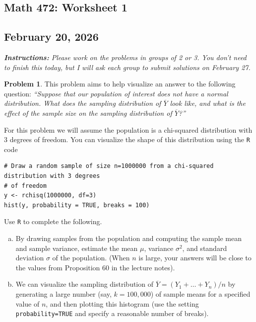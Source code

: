 \documentclass[10pt]{article}
\theoremstyle{definition}
\newtheorem{problem}[theorem]{Problem}
\begin{document}
\begin{center}
  \section*{Math 472: Worksheet 1}
  \subsection*{February 20, 2026}
\end{center}

\textit{\textbf{Instructions:} Please work on the problems in groups of 2 or
  3. You don't need to finish this today, but I will ask each group to submit
  solutions on February 27.}

\vspace{1em}

\begin{problem}
  \label{problem:chi-squared}
  This problem aims to help visualize an answer to the following question:
  \textit{``Suppose that our population of interest does not have a normal
    distribution. What does the sampling distribution of $\overline{Y}$ look
    like, and what is the effect of the sample size on the sampling
    distribution of $\overline{Y}$?''}

  For this problem we will assume the population is a chi-squared distribution
  with 3 degrees of freedom. You can visualize the shape of this distribution
  using the \texttt{R} code
\begin{verbatim}
# Draw a random sample of size n=1000000 from a chi-squared distribution with 3 degrees
# of freedom
y <- rchisq(1000000, df=3)
hist(y, probability = TRUE, breaks = 100)
\end{verbatim}
  Use \texttt{R} to complete the following.
  \begin{enumerate}[(a)]
    \item By drawing samples from the population and computing the sample mean
    and sample variance, estimate the mean $\mu$, variance $\sigma^{2}$, and
    standard deviation $\sigma$ of the population. (When $n$ is large, your
    answers will be close to the values from Proposition 60 in the lecture
    notes).
    \item We can visualize the sampling distribution of
    $\overline{Y}=(Y_{1}+\ldots+Y_{n})/n$ by generating a large number (say,
    $k=100,000$) of sample means for a specified value of $n$, and then
    plotting this histogram (use the setting \texttt{probability=TRUE} and
    specify a reasonable number of breaks).


\end{enumerate}
\end{problem}
\end{document}
